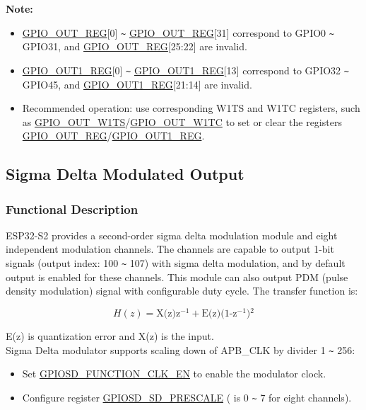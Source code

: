 \documentclass[main\_\_EN.tex]{subfiles}
\begin{document}
{\bfseries Note:}
\begin{itemize}
\item \hyperref[regdesc:GPIOOUTREG]{GPIO\_OUT\_REG}[0] \verb+~+ \hyperref[regdesc:GPIOOUTREG]{GPIO\_OUT\_REG}[31] correspond to GPIO0 \verb+~+ GPIO31, and \hyperref[regdesc:GPIOOUTREG]{GPIO\_OUT\_REG}[25:22] are invalid.
\item \hyperref[regdesc:GPIOOUT1REG]{GPIO\_OUT1\_REG}[0] \verb+~+ \hyperref[regdesc:GPIOOUT1REG]{GPIO\_OUT1\_REG}[13] correspond to GPIO32 \verb+~+ GPIO45, and \hyperref[regdesc:GPIOOUT1REG]{GPIO\_OUT1\_REG}[21:14] are invalid.
\item Recommended operation: use corresponding W1TS and W1TC registers, such as \hyperref[fielddesc:GPIOOUTW1TS]{GPIO\_OUT\_W1TS}/\hyperref[fielddesc:GPIOOUTW1TC]{GPIO\_OUT\_W1TC} to set or clear the registers \hyperref[regdesc:GPIOOUTREG]{GPIO\_OUT\_REG}/\hyperref[regdesc:GPIOOUT1REG]{GPIO\_OUT1\_REG}.
\end{itemize}

\subsection{Sigma Delta Modulated Output}

\subsubsection{Functional Description}

ESP32-S2 provides a second-order sigma delta modulation module and eight independent modulation channels. The channels are capable to output 1-bit signals (output index: 100 \verb+~+ 107) with sigma delta modulation, and by default output is enabled for these channels. This module can also output PDM (pulse density modulation) signal with configurable duty cycle. The transfer function is:

\[
    H(z)=\textrm{X(z)z$^{-1}$} + \textrm{E(z)(1-z$^{-1}$)$^{2}$}
    \]

E(z) is quantization error and X(z) is the input.\\
Sigma Delta modulator supports scaling down of APB\_CLK by divider 1 \verb+~+ 256:
\begin{itemize}
    \item Set \hyperref[fielddesc:GPIOSDFUNCTIONCLKEN]{GPIOSD\_FUNCTION\_CLK\_EN} to enable the modulator clock.
    \item Configure register \hyperref[fielddesc:GPIOSDSDNPRESCALE]{GPIOSD\_SD\_PRESCALE} ( is 0 \verb+~+ 7 for eight channels).
\end{itemize}
\end{document}

